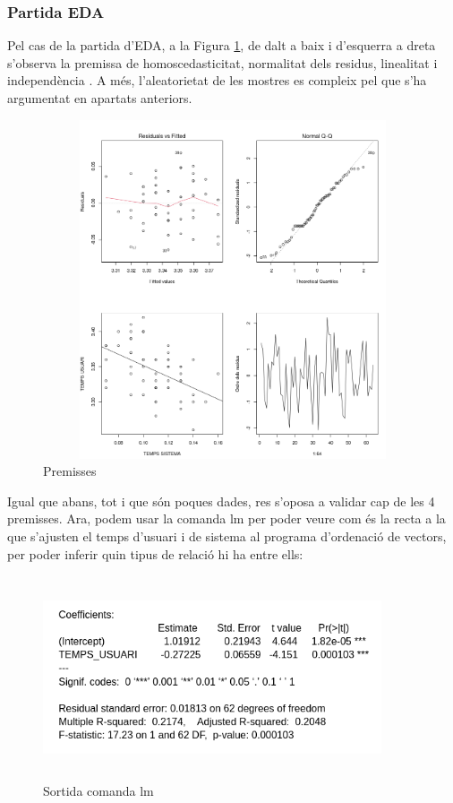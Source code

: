 \documentclass[12pt]{article}
\begin{document}
\hfill \break
\subsubsection{Partida EDA}
Pel cas de la partida d'EDA, a la Figura \ref{fig:prem3}, de dalt a baix i d'esquerra a dreta s'observa la premissa
de homoscedasticitat, normalitat dels residus, linealitat i independència . A més, l'aleatorietat de les mostres es compleix pel que s'ha 
argumentat en apartats anteriors.

\begin{figure}[h!]
  \centering
  \includegraphics[width=15cm, height=10cm]{prem3.png}
  \caption{Premisses}
  \label{fig:prem3}
\end{figure} 

Igual que abans, tot i que són poques dades, res s'oposa a validar cap de les 4 premisses.
\hfill \break
Ara, podem usar la comanda lm per poder veure com és la recta a la que s'ajusten el temps d'usuari i de sistema al programa d'ordenació
de vectors, per poder inferir quin tipus de relació hi ha entre ells:

\begin{figure}[h!]
  \centering
  \includegraphics[width=10cm, height=6cm]{lm3.png}
  \caption{Sortida comanda lm}
  \label{fig:lm3}
\end{figure} 
\end{document}

